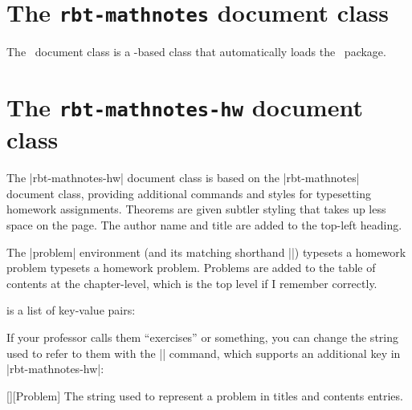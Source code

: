 \documentclass{ltxguidex}
\newcommand{\mn}{\ctan{rbt-mathnotes}}
\begin{document}
\section{The \texttt{rbt-mathnotes} document class}

The \mn\ document class is a -based class that automatically loads
the \mn\ package.

\section{The \texttt{rbt-mathnotes-hw} document class}

The |rbt-mathnotes-hw| document class is based on the |rbt-mathnotes| document
class, providing additional commands and styles for typesetting homework
assignments.  Theorems are given subtler styling that takes up less space on
the page.  The author name and title are added to the top-left heading.


The |problem| environment (and its matching shorthand |\prob|) typesets a
homework problem typesets a homework problem. Problems are added to the table of
contents at the chapter-level, which is the top level if I remember correctly.

 is a list of key-value pairs:


If your professor calls them ``exercises'' or something, you can change the
string used to refer to them with the |\mathnotes| command, which supports an
additional key in |rbt-mathnotes-hw|:
\begin{keys}
  [][Problem]
    The string used to represent a problem in titles and contents entries.
\end{keys}
\end{document}
